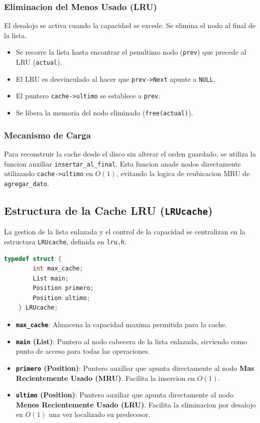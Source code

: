         \subsubsection*{Eliminacion del Menos Usado (LRU)}
        El desalojo se activa cuando la capacidad se excede. Se elimina el nodo al final de la lista.
        \begin{itemize}
            \item Se recorre la lista hasta encontrar el penultimo nodo (\texttt{prev}) que precede al LRU (\texttt{actual}).
            \item El LRU es desvinculado al hacer que \texttt{prev->Next} apunte a \texttt{NULL}.
            \item El puntero \texttt{cache->ultimo} se establece a \texttt{prev}.
            \item Se libera la memoria del nodo eliminado (\texttt{free(actual)}).
        \end{itemize}

        \subsubsection*{Mecanismo de Carga}
        Para reconstruir la cache desde el disco sin alterar el orden guardado, se utiliza la funcion auxiliar \texttt{insertar\_al\_final}. 
        Esta funcion anade nodos directamente utilizando \texttt{cache->ultimo} en $O(1)$, evitando la logica de reubicacion MRU de \texttt{agregar\_dato}.

    \subsection{Estructura de la Cache LRU (\texttt{LRUcache})}
    La gestion de la lista enlazada y el control de la capacidad se centralizan en la estructura \texttt{LRUcache}, definida en \texttt{lru.h}.

    \begin{lstlisting}[caption=Estructura de Control LRUcache, language=C, label=lst:LRUcache]
    typedef struct {
        int max_cache;
        List main;
        Position primero;
        Position ultimo;
    } LRUcache;
    \end{lstlisting}

    \begin{itemize}
        \item \textbf{\texttt{max\_cache}}: Almacena la capacidad maxima permitida para la cache.
        \item \textbf{\texttt{main} (List)}: Puntero al nodo cabecera de la lista enlazada, sirviendo como punto de acceso para todas las operaciones.
        \item \textbf{\texttt{primero} (Position)}: Puntero auxiliar que apunta directamente al nodo \textbf{Mas Recientemente Usado (MRU)}. Facilita la insercion en $O(1)$.
        \item \textbf{\texttt{ultimo} (Position)}: Puntero auxiliar que apunta directamente al nodo \textbf{Menos Recientemente Usado (LRU)}. Facilita la eliminacion por desalojo en $O(1)$ una vez localizado su predecesor.
    \end{itemize}
\newpage
